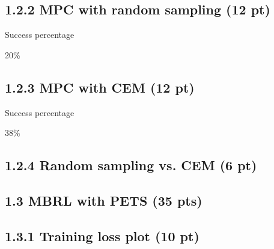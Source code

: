 \documentclass[12pt]{article}
\begin{document}
\subsection*{1.2.2 MPC with random sampling (12 pt)}

Success percentage
\begin{tcolorbox}[fit,height=1cm, width=5cm, blank, borderline={1pt}{1pt},nobeforeafter]
\begin{center}
    20\%
\end{center}
\end{tcolorbox}

\subsection*{1.2.3 MPC with CEM (12 pt)}

Success percentage
\begin{tcolorbox}[fit,height=1cm, width=5cm, blank, borderline={1pt}{1pt},nobeforeafter]
\begin{center}
    38\%
\end{center}
\end{tcolorbox}

\subsection*{1.2.4 Random sampling vs. CEM  (6 pt)}

\begin{tcolorbox}[fit,height=20em, width=40em, blank, borderline={1pt}{1pt},nobeforeafter]
\begin{center}
\end{center}
\end{tcolorbox}


\subsection*{1.3 MBRL with PETS (35 pts)}

\subsection*{1.3.1 Training loss plot (10 pt)}
\end{document}
